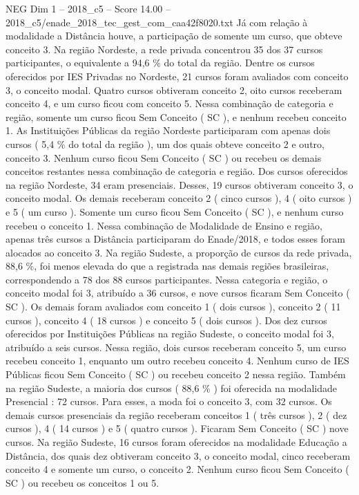 \begin{textsample}{NEG Dim 1 – 2018\_c5 – Score 14.00 – 2018\_c5/enade\_2018\_tec\_gest\_com\_caa42f8020.txt}
Já com relação à modalidade a Distância houve, a participação de somente um curso, que obteve conceito 3.
Na região Nordeste, a rede privada concentrou 35 dos 37 cursos participantes, o equivalente a 94,6 \% do total da região.
Dentre os cursos oferecidos por IES Privadas no Nordeste, 21 cursos foram avaliados com conceito 3, o conceito modal.
Quatro cursos obtiveram conceito 2, oito cursos receberam conceito 4, e um curso ficou com conceito 5.
Nessa combinação de categoria e região, somente um curso ficou Sem Conceito ( SC ), e nenhum recebeu conceito 1.
As Instituições Públicas da região Nordeste participaram com apenas dois cursos ( 5,4 \% do total da região ), um dos quais obteve conceito 2 e outro, conceito 3.
Nenhum curso ficou Sem Conceito ( SC ) ou recebeu os demais conceitos restantes nessa combinação de categoria e região.
Dos cursos oferecidos na região Nordeste, 34 eram presenciais.
Desses, 19 cursos obtiveram conceito 3, o conceito modal.
Os demais receberam conceito 2 ( cinco cursos ), 4 ( oito cursos ) e 5 ( um curso ).
Somente um curso ficou Sem Conceito ( SC ), e nenhum curso recebeu o conceito 1.
Nessa combinação de Modalidade de Ensino e região, apenas três cursos a Distância participaram do Enade/2018, e todos esses foram alocados ao conceito 3.
Na região Sudeste, a proporção de cursos da rede privada, 88,6 \%, foi menos elevada do que a registrada nas demais regiões brasileiras, correspondendo a 78 dos 88 cursos participantes.
Nessa categoria e região, o conceito modal foi 3, atribuído a 36 cursos, e nove cursos ficaram Sem Conceito ( SC ).
Os demais foram avaliados com conceito 1 ( dois cursos ), conceito 2 ( 11 cursos ), conceito 4 ( 18 cursos ) e conceito 5 ( dois cursos ).
Dos dez cursos oferecidos por Instituições Públicas na região Sudeste, o conceito modal foi 3, atribuído a seis cursos.
Nessa região, dois cursos receberam conceito 5, um curso recebeu conceito 1, enquanto um outro recebeu conceito 4.
Nenhum curso de IES Públicas ficou Sem Conceito ( SC ) ou recebeu conceito 2 nessa região.
Também na região Sudeste, a maioria dos cursos ( 88,6 \% ) foi oferecida na modalidade Presencial : 72 cursos.
Para esses, a moda foi o conceito 3, com 32 cursos.
Os demais cursos presenciais da região receberam conceitos 1 ( três cursos ), 2 ( dez cursos ), 4 ( 14 cursos ) e 5 ( quatro cursos ).
Ficaram Sem Conceito ( SC ) nove cursos.
Na região Sudeste, 16 cursos foram oferecidos na modalidade Educação a Distância, dos quais dez obtiveram conceito 3, o conceito modal, cinco receberam conceito 4 e somente um curso, o conceito 2.
Nenhum curso ficou Sem Conceito ( SC ) ou recebeu os conceitos 1 ou 5.

\end{textsample}
